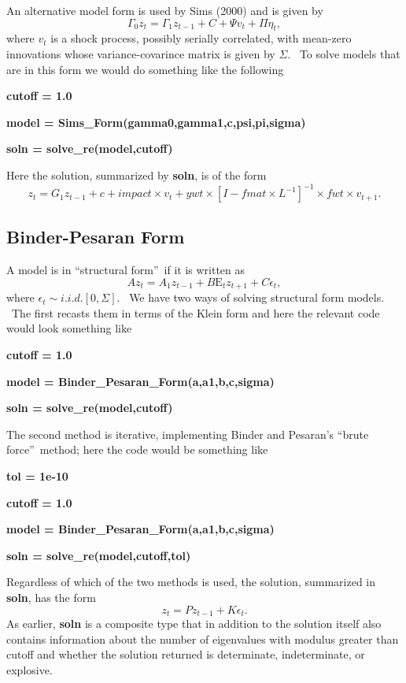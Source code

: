 \documentclass[thmsa,notitlepage,11pt]{article}
\begin{document}
An alternative model form is used by Sims (2000) and is given by%
\[
\Gamma _{0}z_{t}=\Gamma _{1}z_{t-1}+C+\Psi v_{t}+\Pi \eta _{t}, 
\]%
where $v_{t}$ is a shock process, possibly serially correlated, with
mean-zero innovations whose variance-covarince matrix is given by $\Sigma $.
\ To solve models that are in this form we would do something like the
following

\bigskip

\textbf{cutoff = 1.0}

\textbf{model = Sims\_Form(gamma0,gamma1,c,psi,pi,sigma)}

\textbf{soln = solve\_re(model,cutoff)}

\bigskip

Here the solution, summarized by \textbf{soln}, is of the form%
\[
z_{t}=G_{1}z_{t-1}+c+impact\times v_{t}+ywt\times \left[ I-fmat\times L^{-1}%
\right] ^{-1}\times fwt\times v_{t+1}. 
\]

\subsection{Binder-Pesaran Form}

A model is in \textquotedblleft structural form\textquotedblright\ if it is
written as%
\[
Az_{t}=A_{1}z_{t-1}+B\text{E}_{t}z_{t+1}+C\epsilon _{t}, 
\]%
where $\epsilon _{t}\sim i.i.d.[0,\Sigma ]$. \ We have two ways of solving
structural form models. \ The first recasts them in terms of the Klein form
and here the relevant code would look something like

\bigskip

\textbf{cutoff = 1.0}

\textbf{model = Binder\_Pesaran\_Form(a,a1,b,c,sigma)}

\textbf{soln = solve\_re(model,cutoff)}

\bigskip

The second method is iterative, implementing Binder and Pesaran's
\textquotedblleft brute force\textquotedblright\ method; here the code would
be something like

\bigskip

\textbf{tol = 1e-10}

\textbf{cutoff = 1.0}

\textbf{model = Binder\_Pesaran\_Form(a,a1,b,c,sigma)}

\textbf{soln = solve\_re(model,cutoff,tol)}

\bigskip

Regardless of which of the two methods is used, the solution, summarized in 
\textbf{soln}, has the form%
\[
z_{t}=Pz_{t-1}+K\epsilon _{t}. 
\]%
As earlier, \textbf{soln} is a composite type that in addition to the
solution itself also contains information about the number of eigenvalues
with modulus greater than cutoff and whether the solution returned is
determinate, indeterminate, or explosive.
\end{document}
